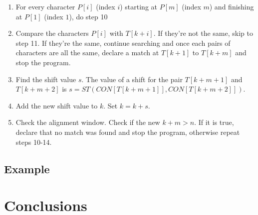 \begin{enumerate}
\item For every character $P[i]$ (index $i$) starting at $P[m]$ (index $m$) and finishing at $P[1]$ (index $1$), do step 10 
	
	\item Compare the characters $P[i]$ with $T[k + i]$. If they're not the same, skip to step 11. If they're the same, continue searching and once each pairs of characters are all the same, declare a match at $T[k+1]$ to $T[k+m]$ and stop the program.

\item Find the shift value $s$. The value of a shift for the pair $T [k +m+ 1]$ and $T [k +m+ 2]$ is $s = ST (CON[T[k + m+ 1]], CON[ T [k +m+ 2]])$. 
	
\item Add the new shift value to $k$. Set $k=k+s$.

\item Check the alignment window. Check if the new $k+m > n$. If it is true, declare that no match was found and stop the program, otherwise repeat steps 10-14. 

\end{enumerate}
\subsection{Example}

\section{Conclusions}

